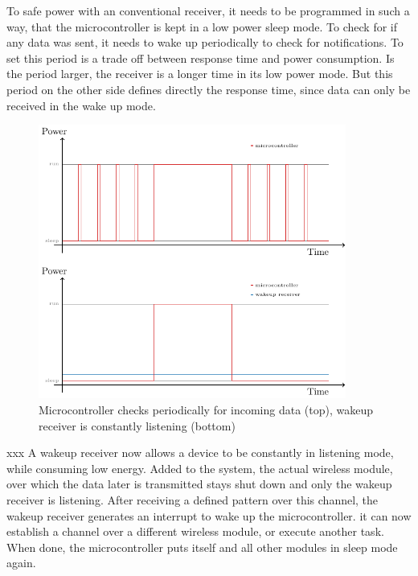 To safe power with an conventional receiver, it needs to be programmed in such a way, that the microcontroller is kept in a low power sleep mode.
To check for if any data was sent, it needs to wake up periodically to check for notifications.
To set this period is a trade off between response time and power consumption.
Is the period larger, the receiver is a longer time in its low power mode.
But this period on the other side defines directly the response time, since data can only be received in the wake up mode.

\begin{figure}[h]
	\centering
	\includegraphics[width=0.9\textwidth]{2-theory/wakeup/graphics/wake_comp.pdf}
	\caption{Microcontroller checks periodically for incoming data (top), wakeup receiver is constantly listening (bottom)\label{theory:wake}}
\end{figure}
xxx
A wakeup receiver now allows a device to be constantly in listening mode, while consuming low energy.
Added to the system, the actual wireless module, over which the data later is transmitted stays shut down and only the wakeup receiver is listening.
After receiving a defined pattern over this channel, the wakeup receiver generates an interrupt to wake up the microcontroller. 
it can now establish a channel over a different wireless module, or execute another task.
When done, the microcontroller puts itself and all other modules in sleep mode again.
